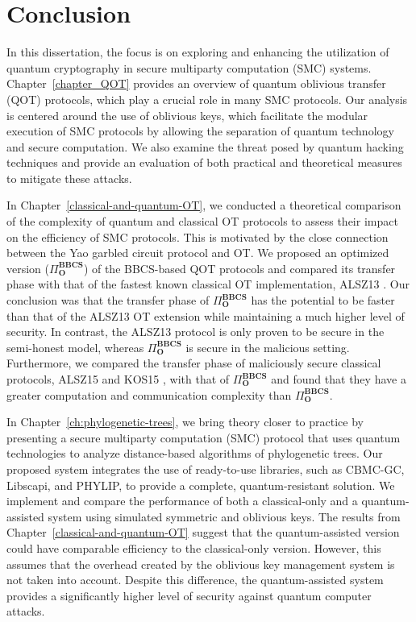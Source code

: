 


%

\chapter{Conclusion}
\label{ch:conclusion}

In this dissertation, the focus is on exploring and enhancing the utilization of quantum cryptography in secure multiparty computation (SMC) systems. Chapter~\ref{chapter_QOT} provides an overview of quantum oblivious transfer (QOT) protocols, which play a crucial role in many SMC protocols. Our analysis is centered around the use of oblivious keys, which facilitate the modular execution of SMC protocols by allowing the separation of quantum technology and secure computation. We also examine the threat posed by quantum hacking techniques and provide an evaluation of both practical and theoretical measures to mitigate these attacks.

In Chapter~\ref{classical-and-quantum-OT}, we conducted a theoretical comparison of the complexity of quantum and classical OT protocols to assess their impact on the efficiency of SMC protocols. This is motivated by the close connection between the Yao garbled circuit protocol and OT. We proposed an optimized version ($\Pi^{\textbf{BBCS}}_{\textbf{O}}$) of the BBCS-based QOT protocols and compared its transfer phase with that of the fastest known classical OT implementation, ALSZ13 \cite{ALSZ13}. Our conclusion was that the transfer phase of $\Pi^{\textbf{BBCS}}_{\textbf{O}}$ has the potential to be faster than that of the ALSZ13 OT extension while maintaining a much higher level of security. In contrast, the ALSZ13 protocol is only proven to be secure in the semi-honest model, whereas $\Pi^{\textbf{BBCS}}_{\textbf{O}}$ is secure in the malicious setting.
Furthermore, we compared the transfer phase of maliciously secure classical protocols, ALSZ15 \cite{ALSZ15} and KOS15 \cite{KOS15}, with that of $\Pi^{\textbf{BBCS}}_{\textbf{O}}$ and found that they have a greater computation and communication complexity than $\Pi^{\textbf{BBCS}}_{\textbf{O}}$.

In Chapter~\ref{ch:phylogenetic-trees}, we bring theory closer to practice by presenting a secure multiparty computation (SMC) protocol that uses quantum technologies to analyze distance-based algorithms of phylogenetic trees. Our proposed system integrates the use of ready-to-use libraries, such as CBMC-GC, Libscapi, and PHYLIP, to provide a complete, quantum-resistant solution. We implement and compare the performance of both a classical-only and a quantum-assisted system using simulated symmetric and oblivious keys. The results from Chapter~\ref{classical-and-quantum-OT} suggest that the quantum-assisted version could have comparable efficiency to the classical-only version. However, this assumes that the overhead created by the oblivious key management system is not taken into account. Despite this difference, the quantum-assisted system provides a significantly higher level of security against quantum computer attacks.

